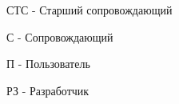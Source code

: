 
\pagebreak
{}

СТС - Старший сопровождающий

С - Сопровождающий

П - Пользователь

РЗ - Разработчик